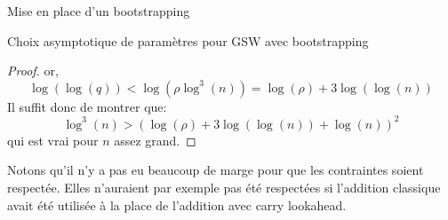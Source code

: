 \begin{section}{Mise en place d'un bootstrapping}
\begin{subsection}{Choix asymptotique de paramètres pour GSW avec bootstrapping}
\begin{proof}
or,
\[ \log(\log(q)) < \log(\rho \log^3(n)) = \log(\rho) + 3 \log(\log(n)) \]
Il suffit donc de montrer que:
\[ \log^3(n) > {(\log(\rho) + 3\log(\log(n)) + \log(n))}^2 \]
qui est vrai pour $n$ assez grand.
\end{proof}
\begin{rmq}
Notons qu'il n'y a pas eu beaucoup de marge pour que les contraintes soient
respectée. Elles n'auraient par exemple pas été respectées si l'addition 
classique avait été utilisée à la place de l'addition avec carry lookahead.
\end{rmq}


\end{subsection}
\end{section}
